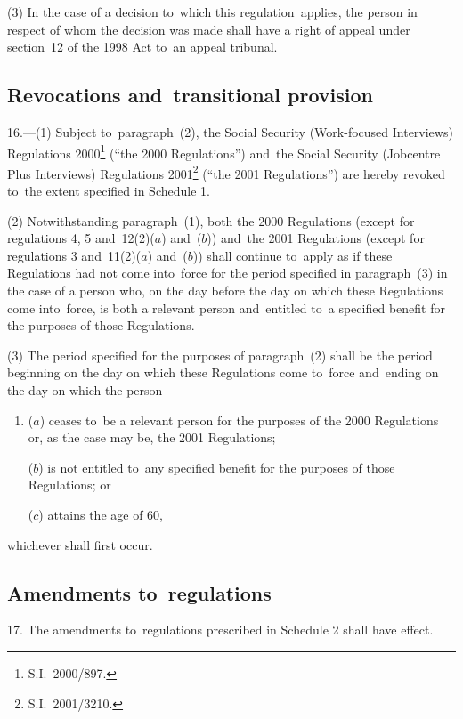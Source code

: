 \documentclass[12pt,a4paper]{article}
\begin{document}
(3) In the case of a decision to~which this regulation~applies, the person in respect of whom the decision was made shall have a right of appeal under section~12 of the 1998 Act to~an appeal tribunal.

\subsection[16. Revocations and~transitional provision]{Revocations and~transitional provision}

\enlargethispage{-\baselineskip}

16.---(1)  Subject to~paragraph~(2), the Social Security (Work-focused Interviews) Regulations 2000\footnote{S.I.~2000/897.} (“the 2000 Regulations”) and~the Social Security (Jobcentre Plus Interviews) Regulations 2001\footnote{S.I.~2001/3210.} (“the 2001 Regulations”) are hereby revoked to~the extent specified in Schedule 1.

(2) Notwithstanding paragraph~(1), both the 2000 Regulations (except for regulations 4, 5 and~12(2)($a$)  and~($b$)) and~the 2001 Regulations (except for regulations 3 and~11(2)($a$)  and~($b$)) shall continue to~apply as if these Regulations had not come into~force for the period specified in paragraph~(3) in the case of a person who, on the day before the day on which these Regulations come into~force, is both a relevant person and~entitled to~a specified benefit for the purposes of those Regulations.

(3) The period specified for the purposes of paragraph~(2) shall be the period beginning on the day on which these Regulations come to~force and~ending on the day on which the person—
\begin{enumerate}\item[]
($a$) ceases to~be a relevant person for the purposes of the 2000 Regulations or, as the case may be, the 2001 Regulations;

($b$) is not entitled to~any specified benefit for the purposes of those Regulations; or

($c$) attains the age of 60,
\end{enumerate}
whichever shall first occur.

\subsection[17. Amendments to~regulations]{Amendments to~regulations}

17.  The amendments to~regulations prescribed in Schedule 2 shall have effect. 
\end{document}
